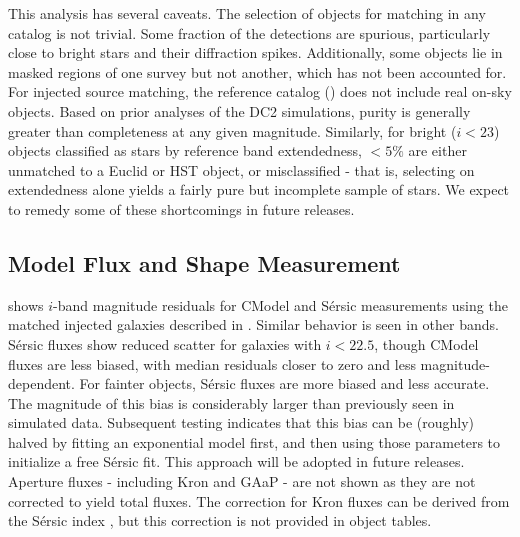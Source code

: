 This analysis has several caveats.
The selection of objects for matching in any catalog is not trivial.
Some fraction of the detections are spurious, particularly close to bright stars and their diffraction spikes.
Additionally, some objects lie in masked regions of one survey but not another, which has not been accounted for. 
For injected source matching, the reference catalog () does not include real on-sky objects.
Based on prior analyses of the \gls{DC2} simulations, purity is generally greater than completeness at any given magnitude.
Similarly, for bright ($i<23$) objects classified as stars by reference band extendedness, $<5\%$ are either unmatched to a Euclid or HST object, or misclassified - that is, selecting on extendedness alone yields a fairly pure but incomplete sample of stars.
We expect to remedy some of these shortcomings in future releases.

\subsection{Model Flux and Shape Measurement}
\label{ssec:fluxes}

 shows $i$-band magnitude residuals for CModel and S\'ersic measurements using the matched injected galaxies described in .
Similar behavior is seen in other bands.
S\'ersic fluxes show reduced scatter for galaxies with $i<22.5$, though CModel fluxes are less biased, with median residuals closer to zero and less magnitude-dependent.
For fainter objects, S\'ersic fluxes are more biased and less accurate.
The magnitude of this bias is considerably larger than previously seen in simulated data.
Subsequent testing indicates that this bias can be (roughly) halved by fitting an exponential model first, and then using those parameters to initialize a free S\'ersic fit.
This approach will be adopted in future releases.
Aperture fluxes - including Kron and \gls{GAaP} - are not shown as they are not corrected to yield total fluxes.
The correction for Kron fluxes can be derived from the S\'ersic index \citep{2005PASA...22..118G}, but this correction is not provided in object tables.

